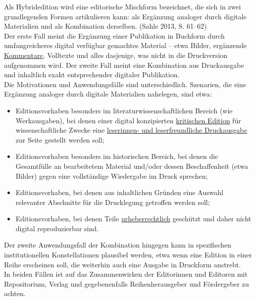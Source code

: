 \documentclass{article}
\begin{document}
    Als Hybridedition wird eine editorische Mischform bezeichnet, die sich in zwei grundlegenden Formen artikulieren kann: als Ergänzung analoger durch digitale Materialien und als Kombination derselben. (Sahle 2013, S. 61–62)\\
            
        Der erste Fall meint die Ergänzung einer Publikation in Buchform durch umfangreicheres digital verfügbar gemachtes Material – etwa Bilder, ergänzende \href{http://gams.uni-graz.at/o:konde.34}{Kommentare}, Volltexte und alles dasjenige, was nicht in die Druckversion aufgenommen wird. Der zweite Fall meint eine Kombination aus Druckausgabe und inhaltlich exakt entsprechender digitaler Publikation.\\
            
        Die Motivationen und Anwendungsfälle sind unterschiedlich. Szenarien, die eine Ergänzung analoger durch digitale Materialien nahelegen, sind etwa:\\
            
        \begin{itemize}\item {Editionsvorhaben besonders im literaturwissenschaftlichen Bereich (wie Werkausgaben), bei denen einer digital konzipierten \href{http://gams.uni-graz.at/o:konde.93}{kritischen Edition} für wissenschaftliche Zwecke eine \href{http://gams.uni-graz.at/o:konde.116}{leserinnen- und leserfreundliche Druckausgabe} zur Seite gestellt werden soll; }\item {Editionsvorhaben besonders im historischen Bereich, bei denen die Gesamtfülle an bearbeitetem Material und/oder dessen Beschaffenheit (etwa Bilder) gegen eine vollständige Wiedergabe im Druck sprechen;}\item {Editionsvorhaben, bei denen aus inhaltlichen Gründen eine Auswahl relevanter Abschnitte für die Drucklegung getroffen werden soll;}\item {Editionsvorhaben, bei denen Teile \href{http://gams.uni-graz.at/o:konde.44}{urheberrechtlich} geschützt und daher nicht digital reproduzierbar sind.}\end{itemize}Der zweite Anwendungsfall der Kombination hingegen kann in spezifischen institutionellen Konstellationen plausibel werden, etwa wenn eine Edition in einer Reihe erscheinen soll, die weiterhin auch eine Ausgabe in Druckform anstrebt.\\
            
        In beiden Fällen ist auf das Zusammenwirken der Editorinnen und Editoren mit Repositorium, Verlag und gegebenenfalls Reihenherausgeber und Fördergeber zu achten.\\
            
\end{document}
